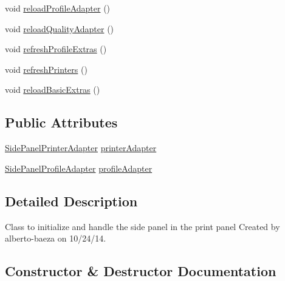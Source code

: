\begin{DoxyCompactItemize}
\item 
void \hyperlink{classandroid_1_1app_1_1printerapp_1_1viewer_1_1sidepanel_1_1_side_panel_handler_a50b7b6f3b822fc052b6bec586a7dfc1f}{reload\+Profile\+Adapter} ()
\item 
void \hyperlink{classandroid_1_1app_1_1printerapp_1_1viewer_1_1sidepanel_1_1_side_panel_handler_a70f6101bbd7d3f3784a697af016081fb}{reload\+Quality\+Adapter} ()
\item 
void \hyperlink{classandroid_1_1app_1_1printerapp_1_1viewer_1_1sidepanel_1_1_side_panel_handler_a1c6c64e07f89a9d8bea8a75e99c547eb}{refresh\+Profile\+Extras} ()
\item 
void \hyperlink{classandroid_1_1app_1_1printerapp_1_1viewer_1_1sidepanel_1_1_side_panel_handler_ab5705b0dc6fdc6ef999409487c350c7e}{refresh\+Printers} ()
\item 
void \hyperlink{classandroid_1_1app_1_1printerapp_1_1viewer_1_1sidepanel_1_1_side_panel_handler_a072b426e2a3edf80186ca15003e10500}{reload\+Basic\+Extras} ()
\end{DoxyCompactItemize}
\subsection*{Public Attributes}
\begin{DoxyCompactItemize}
\item 
\hyperlink{classandroid_1_1app_1_1printerapp_1_1viewer_1_1sidepanel_1_1_side_panel_printer_adapter}{Side\+Panel\+Printer\+Adapter} \hyperlink{classandroid_1_1app_1_1printerapp_1_1viewer_1_1sidepanel_1_1_side_panel_handler_ab828148c3f9b106208128c613fe8a682}{printer\+Adapter}
\item 
\hyperlink{classandroid_1_1app_1_1printerapp_1_1viewer_1_1sidepanel_1_1_side_panel_profile_adapter}{Side\+Panel\+Profile\+Adapter} \hyperlink{classandroid_1_1app_1_1printerapp_1_1viewer_1_1sidepanel_1_1_side_panel_handler_a315040dbdc657e3f58b7b65c34f252ee}{profile\+Adapter}
\end{DoxyCompactItemize}


\subsection{Detailed Description}
Class to initialize and handle the side panel in the print panel Created by alberto-\/baeza on 10/24/14. 

\subsection{Constructor \& Destructor Documentation}
\mbox{\label{classandroid_1_1app_1_1printerapp_1_1viewer_1_1sidepanel_1_1_side_panel_handler_ac7b08334541f2f2dcf2d97e86cf782de}} 
